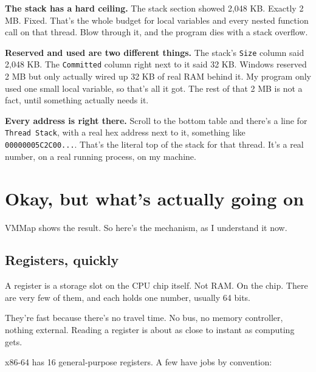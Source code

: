 \documentclass[11pt,a4paper]{article}
\begin{document}
\textbf{The stack has a hard ceiling.}
The stack section showed 2,048 KB. Exactly 2 MB. Fixed. That's the whole budget for local variables and every nested function call on that thread. Blow through it, and the program dies with a stack overflow.

\textbf{Reserved and used are two different things.}
The stack's \texttt{Size} column said 2,048 KB. The \texttt{Committed} column right next to it said 32 KB. Windows reserved 2 MB but only actually wired up 32 KB of real RAM behind it. My program only used one small local variable, so that's all it got. The rest of that 2 MB is not a fact, until something actually needs it.

\textbf{Every address is right there.}
Scroll to the bottom table and there's a line for \texttt{Thread Stack}, with a real hex address next to it, something like \texttt{00000005C2C00...}. That's the literal top of the stack for that thread. It's a real number, on a real running process, on my machine.

\section{Okay, but what's actually going on}

VMMap shows the result. So here's the mechanism, as I understand it now.

\subsection{Registers, quickly}

A register is a storage slot on the CPU chip itself. Not RAM. On the chip. There are very few of them, and each holds one number, usually 64 bits.

They're fast because there's no travel time. No bus, no memory controller, nothing external. Reading a register is about as close to instant as computing gets.

x86-64 has 16 general-purpose registers. A few have jobs by convention:
\end{document}
